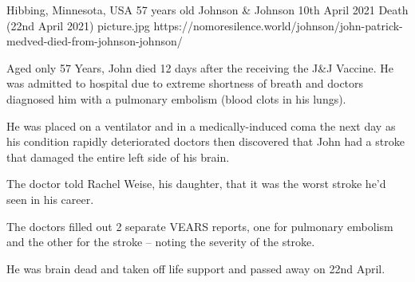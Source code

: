 {Hibbing, Minnesota, USA}
{57 years old}
{Johnson \& Johnson}
{10th April 2021}
{Death (22nd April 2021)}
{picture.jpg}
{https://nomoresilence.world/johnson/john-patrick-medved-died-from-johnson-johnson/}
{

Aged only 57 Years, John died 12 days after the receiving the J\&J Vaccine. He
was admitted to hospital due to extreme shortness of breath and doctors
diagnosed him with a pulmonary embolism (blood clots in his lungs).

He was placed on a ventilator and in a medically-induced coma the next day as
his condition rapidly deteriorated doctors then discovered that John had a
stroke that damaged the entire left side of his brain.

The doctor told Rachel Weise, his daughter, that it was the worst stroke he’d
seen in his career.

The doctors filled out 2 separate VEARS reports, one for pulmonary embolism and
the other for the stroke – noting the severity of the stroke.

He was brain dead and taken off life support and passed away on 22nd April.

}
